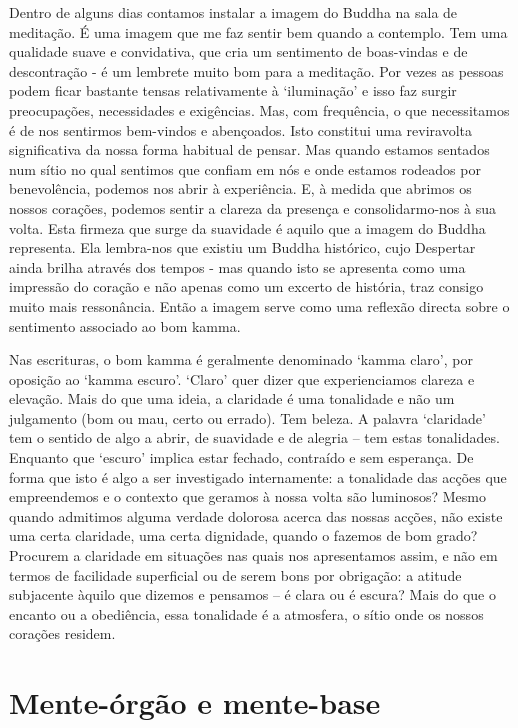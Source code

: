 Dentro de alguns dias contamos instalar a imagem do Buddha na sala de meditação.
É uma imagem que me faz sentir bem quando a contemplo. Tem uma qualidade suave e
convidativa, que cria um sentimento de boas-vindas e de descontração - é um
lembrete muito bom para a meditação. Por vezes as pessoas podem ficar bastante
tensas relativamente à `iluminação' e isso faz surgir preocupações, necessidades
e exigências. Mas, com frequência, o que necessitamos é de nos sentirmos
bem-vindos e abençoados. Isto constitui uma reviravolta significativa da nossa
forma habitual de pensar. Mas quando estamos sentados num sítio no qual sentimos
que confiam em nós e onde estamos rodeados por benevolência, podemos nos abrir à
experiência. E, à medida que abrimos os nossos corações, podemos sentir a
clareza da presença e consolidarmo-nos à sua volta. Esta firmeza que surge da
suavidade é aquilo que a imagem do Buddha representa. Ela lembra-nos que existiu
um Buddha histórico, cujo Despertar ainda brilha através dos tempos - mas quando
isto se apresenta como uma impressão do coração e não apenas como um excerto de
história, traz consigo muito mais ressonância. Então a imagem serve como uma
reflexão directa sobre o sentimento associado ao bom kamma.

Nas escrituras, o bom kamma é geralmente denominado `kamma claro', por oposição
ao `kamma escuro'. `Claro' quer dizer que experienciamos clareza e elevação.
Mais do que uma ideia, a claridade é uma tonalidade e não um julgamento (bom ou
mau, certo ou errado). Tem beleza. A palavra `claridade' tem o sentido de algo a
abrir, de suavidade e de alegria -- tem estas tonalidades. Enquanto que `escuro'
implica estar fechado, contraído e sem esperança. De forma que isto é algo a ser
investigado internamente: a tonalidade das acções que empreendemos e o contexto
que geramos à nossa volta são luminosos? Mesmo quando admitimos alguma verdade
dolorosa acerca das nossas acções, não existe uma certa claridade, uma certa
dignidade, quando o fazemos de bom grado? Procurem a claridade em situações nas
quais nos apresentamos assim, e não em termos de facilidade superficial ou de
serem bons por obrigação: a atitude subjacente àquilo que dizemos e pensamos --
é clara ou é escura? Mais do que o encanto ou a obediência, essa tonalidade é a
atmosfera, o sítio onde os nossos corações residem.

\section{Mente-órgão e mente-base}

